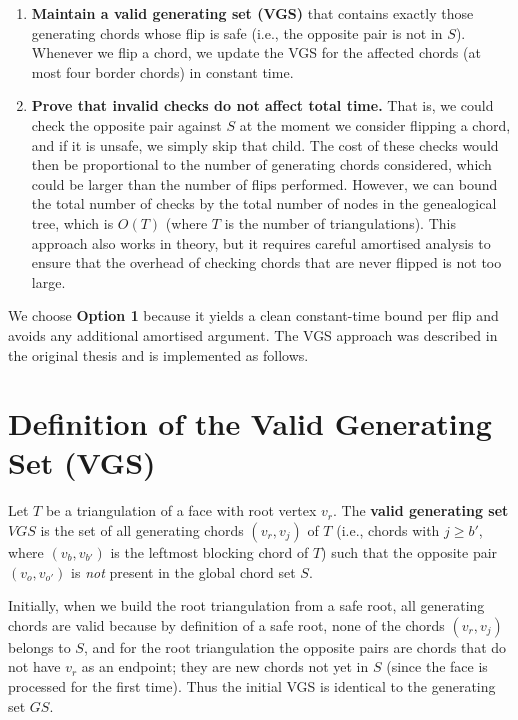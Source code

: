 \begin{enumerate}[label=\textbf{Option \arabic*:}]
    \item \textbf{Maintain a valid generating set (VGS)} that contains exactly those generating chords whose flip is safe (i.e., the opposite pair is not in \(S\)). 
    Whenever we flip a chord, we update the VGS for the affected chords (at most four border chords) in constant time.
    
    \item \textbf{Prove that invalid checks do not affect total time.} 
    That is, we could check the opposite pair against \(S\) at the moment we consider flipping a chord, and if it is unsafe, we simply skip that child. 
    The cost of these checks would then be proportional to the number of generating chords considered, which could be larger than the number of flips performed. 
    However, we can bound the total number of checks by the total number of nodes in the genealogical tree, which is \(O(T)\) (where \(T\) is the number of triangulations). 
    This approach also works in theory, but it requires careful amortised analysis to ensure that the overhead of checking chords that are never flipped is not too large.
\end{enumerate}

We choose \textbf{Option 1} because it yields a clean constant-time bound per flip and avoids any additional amortised argument. 
The VGS approach was described in the original thesis and is implemented as follows.

\section{Definition of the Valid Generating Set (VGS)}
\label{sec:vgs_definition}

\begin{definition}
    \label{def:vgs}
    Let \(T\) be a triangulation of a face with root vertex \(v_r\). 
    The \textbf{valid generating set} \(VGS\) is the set of all generating chords \((v_r, v_j)\) of \(T\) (i.e., chords with \(j \ge b'\), where \((v_b, v_{b'})\) is the leftmost blocking chord of \(T\)) such that the opposite pair \((v_o, v_{o'})\) is \emph{not} present in the global chord set \(S\).
\end{definition}

Initially, when we build the root triangulation from a safe root, all generating chords are valid because by definition of a safe root, none of the chords \((v_r, v_j)\) belongs to \(S\), and for the root triangulation the opposite pairs are chords that do not have \(v_r\) as an endpoint; they are new chords not yet in \(S\) (since the face is processed for the first time). 
Thus the initial VGS is identical to the generating set \(GS\).

